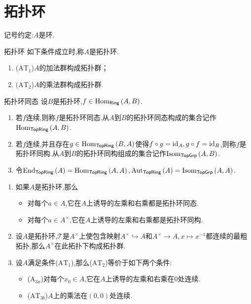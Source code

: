 \section{拓扑环}

记号约定:$A$是环.

\begin{definition}{拓扑环}{}
	如下条件成立时,称$A$是拓扑环.
	\begin{enumerate}
		\item ($\mathrm{AT}_{1}$)$A$的加法群构成拓扑群；
		\item ($\mathrm{AT}_{2}$)$A$的乘法群构成拓扑群.
	\end{enumerate}
\end{definition}

\begin{definition}{拓扑环同态}{}
	设$B$是拓扑环,$f\in\operatorname{Hom}_{\mathsf{Ring}}\left(A,B\right)$.
	\begin{enumerate}
		\item 若$f$连续,则称$f$是拓扑环同态.从$A$到$B$的拓扑环同态构成的集合记作$\operatorname{Hom}_{\mathsf{TopRing}}\left(A,B\right)$.
		\item 若$f$连续,并且存在$g\in\operatorname{Hom}_{\mathsf{TopRing}}\left(B,A\right)$使得$f\circ g=\operatorname{id}_{A},g\circ f=\operatorname{id}_{B}$,则称$f$是拓扑环同构.从$A$到$B$的拓扑环同构组成的集合记作$\operatorname{Isom}_{\mathsf{TopGrp}}\left(A,B\right)$.
		\item 令$\operatorname{End}_{\mathsf{TopRing}}\left(A\right)=\operatorname{Hom}_{\mathsf{TopRing}}\left(A,A\right),\operatorname{Aut}_{\mathsf{TopRing}}\left(A\right)=\operatorname{Isom}_{\mathsf{TopGrp}}\left(A,A\right)$.
	\end{enumerate}
\end{definition}

\begin{remark}{}{}
	\begin{enumerate}
		\item 如果$A$是拓扑环,那么
		\begin{itemize}
			\item 对每个$a\in A$,它在$A$上诱导的左乘和右乘都是拓扑环同态.
			\item 对每个$a\in A^{\times}$,它在$A$上诱导的左乘和右乘都是拓扑环同构.
		\end{itemize}
		\item 设$A$是拓扑环,$\mathcal{T}$是$A^{\times}$上使包含映射$A^{\times}\hookrightarrow A$和$A^{\times}\to A,x\mapsto x^{-1}$都连续的最粗拓扑,那么$A^{\times}$在此拓扑下构成拓扑群.
		\item 设$A$满足条件($\mathrm{AT}_{1}$),那么($\mathrm{AT}_{2}$)等价于如下两个条件:
		\begin{itemize}
			\item ($\mathrm{A}_{3a}$)对每个$x_{0}\in A$,它在$A$上诱导的左乘和右乘在$0$处连续.
			\item ($\mathrm{AT}_{3b}$)$A$上的乘法在$\left(0,0\right)$处连续.
		\end{itemize}
	\end{enumerate}
\end{remark}

